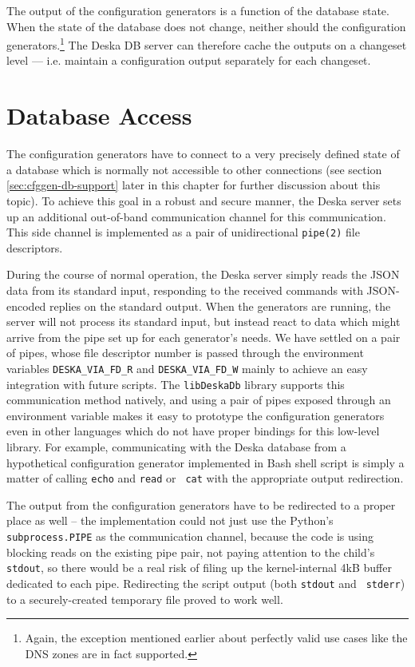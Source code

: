 \documentclass[deska]{subfiles}
\begin{document}
The output of the configuration generators is a function of the database state.  When the state of the database does not
change, neither should the configuration generators.\footnote{Again, the exception mentioned earlier about perfectly
valid use cases like the DNS zones are in fact supported.}  The Deska DB server can therefore cache the outputs on a changeset
level --- i.e. maintain a configuration output separately for each changeset.

\section{Database Access}
\label{sec:cfggen-pipes}

The configuration generators have to connect to a very precisely defined state of a database which is normally not
accessible to other connections (see section \ref{sec:cfggen-db-support} later in this chapter for further discussion
about this topic).  To achieve this goal in a robust and secure manner, the Deska server sets up an additional
out-of-band communication channel for this communication.  This side channel is implemented as a pair of unidirectional
{\tt pipe(2)} file descriptors.

During the course of normal operation, the Deska server simply reads the JSON data from its standard input, responding
to the received commands with JSON-encoded replies on the standard output.  When the generators are running, the server
will not process its standard input, but instead react to data which might arrive from the pipe set up for each
generator's needs.  We have settled on a pair of pipes, whose file descriptor number is passed through the environment
variables {\tt DESKA\_VIA\_FD\_R} and {\tt DESKA\_VIA\_FD\_W} mainly to achieve an easy integration with future scripts.
The {\tt libDeskaDb} library supports this communication method natively, and using a pair of pipes exposed through an
environment variable makes it easy to prototype the configuration generators even in other languages which do not have
proper bindings for this low-level library.  For example, communicating with the Deska database from a hypothetical
configuration generator implemented in Bash shell script is simply a matter of calling {\tt echo} and {\tt read} or {\tt
cat} with the appropriate output redirection.

The output from the configuration generators have to be redirected to a proper place as well -- the implementation could
not just use the Python's {\tt subprocess.PIPE} as the communication channel, because the code is using blocking reads
on the existing pipe pair, not paying attention to the child's {\tt stdout}, so there would be a real risk of filing up
the kernel-internal 4kB buffer dedicated to each pipe.  Redirecting the script output (both {\tt stdout} and {\tt
stderr}) to a securely-created temporary file proved to work well.
\end{document}
